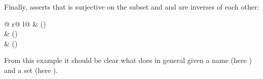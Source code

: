 \begin{isabellebody}
\begin{isamarkuptext}
\begin{center}
\end{center}
Finally,  asserts that  is
surjective on the subset  and  and  are inverses of each other:
\begin{center}
\begin{tabular}{@ {}r@ {\qquad\qquad}l@ {}}
 & () \\
 & () \\
 & ()
\end{tabular}
\end{center}
%
From this example it should be clear what  does
in general given a name (here ) and a set
(here ).


\end{isamarkuptext}
\end{isabellebody}
